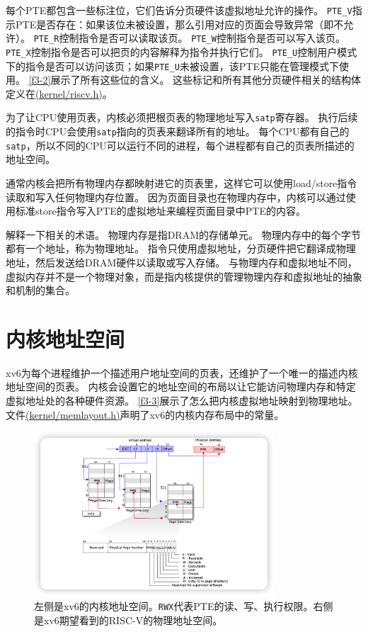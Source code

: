 每个PTE都包含一些标注位，它们告诉分页硬件该虚拟地址允许的操作。
\texttt{PTE\_V}指示PTE是否存在：如果该位未被设置，那么引用对应的页面会导致异常（即不允许）。
\texttt{PTE\_R}控制指令是否可以读取该页。
\texttt{PTE\_W}控制指令是否可以写入该页。
\texttt{PTE\_X}控制指令是否可以把页的内容解释为指令并执行它们。
\texttt{PTE\_U}控制用户模式下的指令是否可以访问该页；如果\texttt{PTE\_U}未被设置，该PTE只能在管理模式下使用。
\autoref{f3-2}展示了所有这些位的含义。
这些标记和所有其他分页硬件相关的结构体定义在\href{https://github.com/mit-pdos/xv6-riscv/blob/risc/kernel/riscv.h}{(kernel/riscv.h)}。

为了让CPU使用页表，内核必须把根页表的物理地址写入\texttt{satp}寄存器。
执行后续的指令时CPU会使用\texttt{satp}指向的页表来翻译所有的地址。
每个CPU都有自己的\texttt{satp}，所以不同的CPU可以运行不同的进程，每个进程都有自己的页表所描述的地址空间。

通常内核会把所有物理内存都映射进它的页表里，这样它可以使用load/store指令读取和写入任何物理内存位置。
因为页面目录也在物理内存中，内核可以通过使用标准store指令写入PTE的虚拟地址来编程页面目录中PTE的内容。

解释一下相关的术语。
物理内存是指DRAM的存储单元。
物理内存中的每个字节都有一个地址，称为物理地址。
指令只使用虚拟地址，分页硬件把它翻译成物理地址，然后发送给DRAM硬件以读取或写入存储。
与物理内存和虚拟地址不同，虚拟内存并不是一个物理对象，而是指内核提供的管理物理内存和虚拟地址的抽象和机制的集合。

\section{内核地址空间}
xv6为每个进程维护一个描述用户地址空间的页表，还维护了一个唯一的描述内核地址空间的页表。
内核会设置它的地址空间的布局以让它能访问物理内存和特定虚拟地址处的各种硬件资源。
\autoref{f3-3}展示了怎么把内核虚拟地址映射到物理地址。
文件\href{URL}{(kernel/memlayout.h)}声明了xv6的内核内存布局中的常量。

\begin{figure}[htbp]
    \centering
    \includegraphics[width=0.8\textwidth]{../imgs/f3-2.png}
    \caption{左侧是xv6的内核地址空间。\texttt{RWX}代表PTE的读、写、执行权限。右侧是xv6期望看到的RISC-V的物理地址空间。}
    \label{f3-3}
\end{figure}

